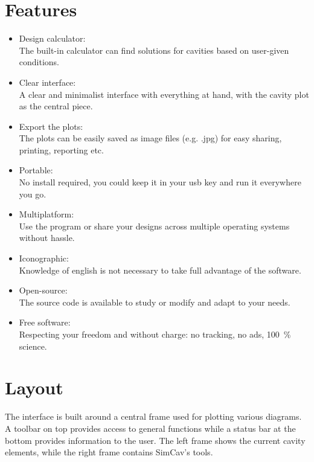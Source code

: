 \documentclass[11pt,a4paper,article,oneside]{memoir}
\begin{document}
	\section{Features}
	\begin{itemize}
		\item Design calculator:\\
		The built-in calculator can find solutions for cavities based on user-given conditions.
		
		\item Clear interface:\\
		A clear and minimalist interface with everything at hand, with the cavity plot as the central piece.
		
		\item Export the plots:\\
		The plots can be easily saved as image files (e.g. .jpg) for easy sharing, printing, reporting etc.
		
		\item Portable:\\
		No install required, you could keep it in your usb key and run it everywhere you go.
		
		\item Multiplatform:\\
		Use the program or share your designs across multiple operating systems without hassle.
		
		\item Iconographic:\\
		Knowledge of english is not necessary to take full advantage of the software.
		
		\item Open-source:\\
		The source code is available to study or modify and adapt to your needs.
		
		\item Free software:\\
		Respecting your freedom and without charge: no tracking, no ads, \SI{100}{\percent} science.
	\end{itemize}
	
	\newpage
	\section{Layout}
	The interface is built around a central frame used for plotting various diagrams. A toolbar on top provides access to general functions while a status bar at the bottom provides information to the user. The left frame shows the current cavity elements, while the right frame contains SimCav's tools.
	
\end{document}
